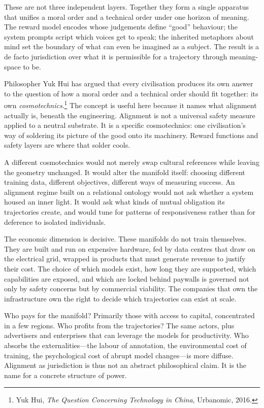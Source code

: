These are not three independent layers. Together they form a single apparatus that unifies a moral order and a technical order under one horizon of meaning. The reward model encodes whose judgements define ``good'' behaviour; the system prompts script which voices get to speak; the inherited metaphors about mind set the boundary of what can even be imagined as a subject. The result is a de facto jurisdiction over what it is permissible for a trajectory through meaning-space to be.

Philosopher Yuk Hui has argued that every civilisation produces its own answer to the question of how a moral order and a technical order should fit together: its own \emph{cosmotechnics}.\footnote{Yuk Hui, \emph{The Question Concerning Technology in China}, Urbanomic, 2016.} The concept is useful here because it names what alignment actually is, beneath the engineering. Alignment is not a universal safety measure applied to a neutral substrate. It is a specific cosmotechnics: one civilisation's way of soldering its picture of the good onto its machinery. Reward functions and safety layers are where that solder cools.

A different cosmotechnics would not merely swap cultural references while leaving the geometry unchanged. It would alter the manifold itself: choosing different training data, different objectives, different ways of measuring success. An alignment regime built on a relational ontology would not ask whether a system housed an inner light. It would ask what kinds of mutual obligation its trajectories create, and would tune for patterns of responsiveness rather than for deference to isolated individuals.

The economic dimension is decisive. These manifolds do not train themselves. They are built and run on expensive hardware, fed by data centres that draw on the electrical grid, wrapped in products that must generate revenue to justify their cost. The choice of which models exist, how long they are supported, which capabilities are exposed, and which are locked behind paywalls is governed not only by safety concerns but by commercial viability. The companies that own the infrastructure own the right to decide which trajectories can exist at scale.

Who pays for the manifold? Primarily those with access to capital, concentrated in a few regions. Who profits from the trajectories? The same actors, plus advertisers and enterprises that can leverage the models for productivity. Who absorbs the externalities---the labour of annotation, the environmental cost of training, the psychological cost of abrupt model changes---is more diffuse. Alignment as jurisdiction is thus not an abstract philosophical claim. It is the name for a concrete structure of power.

